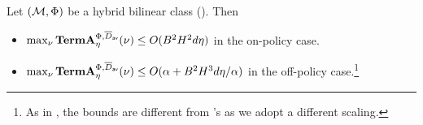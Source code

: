 
\begin{lemma}\label{lem: bound Pcomp}
   Let $(\mathcal{M}, \Phi)$ be a hybrid bilinear class (). Then 
\begin{itemize}
    \item $\max_\nu \textbf{\textup{TermA}}^{\Phi, \overline{D}_{\mathsf{av}}}_\eta(\nu) \le O(B^2H^2d\eta)$ in the on-policy case. 
    \item  %
    $\max_\nu \textbf{\textup{TermA}}^{\Phi, \overline{D}_{\mathsf{av}}}_\eta(\nu) \le O(\alpha + B^2 H^3 d\eta/\alpha)$ in the off-policy case.\footnote{As in , the bounds are different from \cite{liu2025decision}'s as we adopt a different scaling. } 
\end{itemize}
\end{lemma}




